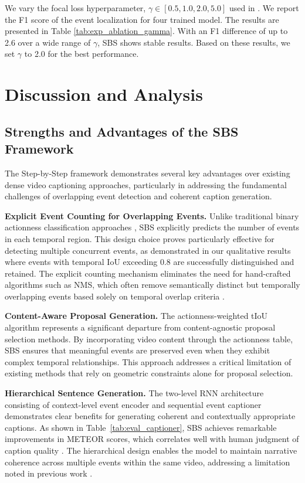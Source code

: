 We vary the focal loss hyperparameter, $\gamma \in \left[0.5, 1.0, 2.0, 5.0\right]$ used in \cite{lin2017focal}.
We report the F1 score of the event localization for four trained model.
The results are presented in Table \ref{tab:exp_ablation_gamma}.
With an F1 difference of up to 2.6 over a wide range of $\gamma$, SBS shows stable results.
Based on these results, we set $\gamma$ to 2.0 for the best performance.


\section{Discussion and Analysis}
\label{sec:discussion}

\subsection{Strengths and Advantages of the SBS Framework}

The Step-by-Step framework demonstrates several key advantages over existing dense video captioning approaches, particularly in addressing the fundamental challenges of overlapping event detection and coherent caption generation.

\textbf{Explicit Event Counting for Overlapping Events.}
Unlike traditional binary actionness classification approaches \cite{lin2018bsn,long2019gaussian}, SBS explicitly predicts the number of events in each temporal region. This design choice proves particularly effective for detecting multiple concurrent events, as demonstrated in our qualitative results where events with temporal IoU exceeding 0.8 are successfully distinguished and retained. The explicit counting mechanism eliminates the need for hand-crafted algorithms such as NMS, which often remove semantically distinct but temporally overlapping events based solely on temporal overlap criteria \cite{hosang2017learning}.

\textbf{Content-Aware Proposal Generation.}
The actionness-weighted tIoU algorithm represents a significant departure from content-agnostic proposal selection methods. By incorporating video content through the actionness table, SBS ensures that meaningful events are preserved even when they exhibit complex temporal relationships. This approach addresses a critical limitation of existing methods \cite{krishna2017dense,wang2018bidirectional} that rely on geometric constraints alone for proposal selection.

\textbf{Hierarchical Sentence Generation.}
The two-level RNN architecture consisting of context-level event encoder and sequential event captioner demonstrates clear benefits for generating coherent and contextually appropriate captions. As shown in Table~\ref{tab:eval_captioner}, SBS achieves remarkable improvements in METEOR scores, which correlates well with human judgment of caption quality \cite{banerjee2005meteor}. The hierarchical design enables the model to maintain narrative coherence across multiple events within the same video, addressing a limitation noted in previous work \cite{xiong2018move,lei2020mart}.

